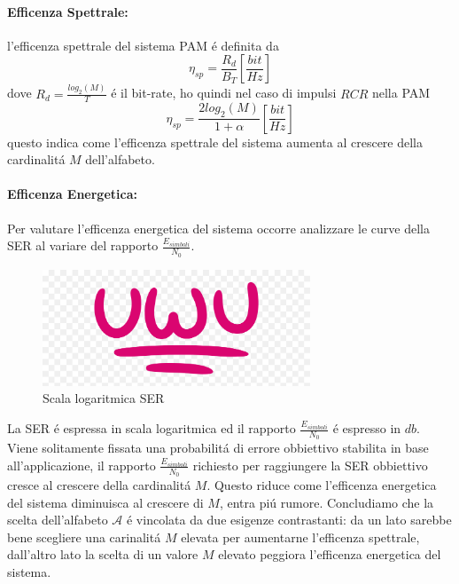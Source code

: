             \paragraph{Efficenza Spettrale: }\label{Efficenza Spettrale} l'efficenza spettrale del sistema PAM é definita da 
                \[
                    \eta_{sp} = \frac{R_d}{B_T} [\frac{bit}{Hz}]    
                \]
                dove $R_d=\frac{log_2(M)}{T}$ é il bit-rate, ho quindi nel caso di impulsi $RCR$ 
                nella PAM
                \[
                    \eta_{sp} = \frac{2log_2(M)}{1+\alpha} [\frac{bit}{Hz}]    
                \]
                questo indica come l'efficenza spettrale del sistema aumenta al crescere della cardinalitá $M$
                dell'alfabeto. 
            \paragraph{Efficenza Energetica: }\label{Efficenza Energetica}
                Per valutare l'efficenza energetica del sistema occorre analizzare le curve della SER 
                al variare del rapporto $\frac{E_{simboli}}{N_0}$.
                \begin{figure}[H]
                    \centering
                    \includegraphics*[width = 8cm]{media/uwu.png}
                    \caption{Scala logaritmica SER}
                \end{figure}
                La SER é espressa in scala logaritmica ed il rapporto $\frac{E_{simboli}}{N_0}$ é espresso in $db$.
                Viene solitamente fissata una probabilitá di errore obbiettivo stabilita in base all'applicazione, il
                rapporto $\frac{E_{simboli}}{N_0}$ richiesto per raggiungere la SER obbiettivo cresce al crescere della 
                cardinalitá $M$. Questo riduce come l'efficenza energetica del sistema diminuisca al crescere di $M$, entra piú rumore.
                Concludiamo che la scelta dell'alfabeto $\mathcal{A}$ é vincolata da due esigenze contrastanti:
                da un lato sarebbe bene scegliere una carinalitá $M$ elevata per aumentarne l'efficenza spettrale, dall'altro
                lato la scelta di un valore $M$ elevato peggiora l'efficenza energetica del sistema.

